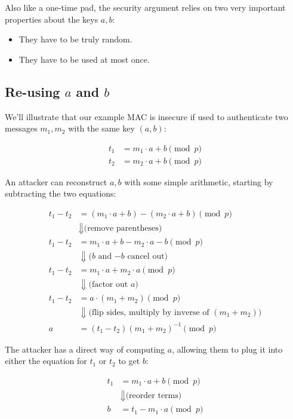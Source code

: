 \documentclass[11pt,ebook,table,dvipsnames]{memoir}
\begin{document}
Also like a one-time pad, the security argument relies on two very
important properties about the keys $a, b$:

\begin{itemize}
\item They have to be truly random.
\item They have to be used at most once.
\end{itemize}

\subsection{Re-using $a$ and $b$}
\label{sec-2-7-5-1}

We'll illustrate that our example MAC is insecure if used to authenticate
two messages $m_1, m_2$ with the same key $(a, b)$:

\begin{align*}
t_1 &= m_1 \cdot a + b \pmod p \\
t_2 &= m_2 \cdot a + b \pmod p
\end{align*}

An attacker can reconstruct $a, b$ with some simple arithmetic,
starting by subtracting the two equations:

\begin{align*}
  t_1 - t_2 &= (m_1 \cdot a + b) - (m_2 \cdot a + b) \pmod p \\
  &\Downarrow \text{(remove parentheses)} \\
  t_1 - t_2 &= m_1 \cdot a + b - m_2 \cdot a - b \pmod p \\
  &\Downarrow \text{($b$ and $-b$ cancel out)} \\
  t_1 - t_2 &= m_1 \cdot a + m_2 \cdot a \pmod p \\
  &\Downarrow \text{(factor out $a$)} \\
  t_1 - t_2 &= a \cdot (m_1 + m_2) \pmod p \\
  &\Downarrow \text{(flip sides, multiply by inverse of $(m_1 + m_2)$)} \\
  a &= (t_1 - t_2)(m_1 + m_2)^{-1} \pmod p
\end{align*}

The attacker has a direct way of computing $a$, allowing them to plug
it into either the equation for $t_1$ or $t_2$ to get $b$:

\begin{align*}
t_1 &= m_1 \cdot a + b \pmod p \\
&\Downarrow \text{(reorder terms)}\\
b &= t_1 - m_1 \cdot a \pmod p
\end{align*}
\end{document}
